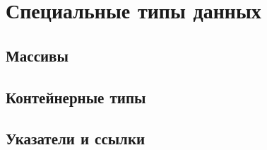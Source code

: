 \chapter{Специальные типы данных}

\section{Массивы}

\section{Контейнерные типы}

\section{Указатели и ссылки}
